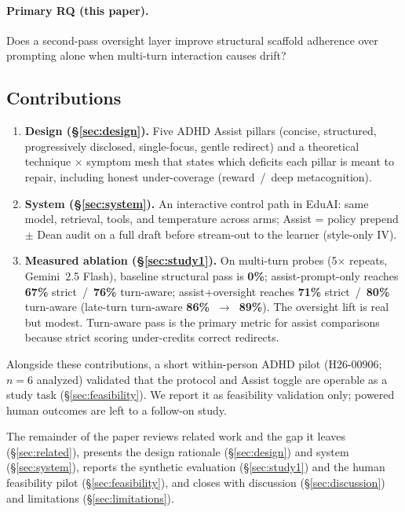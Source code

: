 \paragraph{Primary RQ (this paper).}
Does a second-pass oversight layer improve structural scaffold adherence over
prompting alone when multi-turn interaction causes drift?

\subsection{Contributions}

\begin{enumerate}
  \item \textbf{Design (\S\ref{sec:design}).}
    Five ADHD Assist pillars (concise, structured, progressively disclosed,
    single-focus, gentle redirect) and a theoretical technique $\times$
    symptom mesh that states which deficits each pillar is meant to repair,
    including honest under-coverage (reward~/~deep metacognition).
  \item \textbf{System (\S\ref{sec:system}).}
    An interactive control path in EduAI: same model, retrieval, tools, and
    temperature across arms; Assist = policy prepend $\pm$ Dean audit on a
    full draft before stream-out to the learner (style-only IV).
  \item \textbf{Measured ablation (\S\ref{sec:study1}).}
    On multi-turn probes (5$\times$ repeats, Gemini~2.5 Flash), baseline
    structural pass is \textbf{0\%}; assist-prompt-only reaches
    \textbf{67\%} strict~/~\textbf{76\%} turn-aware; assist+oversight reaches
    \textbf{71\%} strict~/~\textbf{80\%} turn-aware (late-turn turn-aware
    \textbf{86\%~$\rightarrow$~89\%}). The oversight lift is real but modest.
    Turn-aware pass is the primary metric for assist comparisons because
    strict scoring under-credits correct redirects.
\end{enumerate}

Alongside these contributions, a short within-person ADHD pilot (H26-00906;
$n{=}6$ analyzed) validated that the protocol and Assist toggle are operable
as a study task (\S\ref{sec:feasibility}). We report it as feasibility
validation only; powered human outcomes are left to a follow-on study.

The remainder of the paper reviews related work and the gap it leaves
(\S\ref{sec:related}), presents the design rationale (\S\ref{sec:design}) and
system (\S\ref{sec:system}), reports the synthetic evaluation
(\S\ref{sec:study1}) and the human feasibility pilot
(\S\ref{sec:feasibility}), and closes with discussion
(\S\ref{sec:discussion}) and limitations (\S\ref{sec:limitations}).
